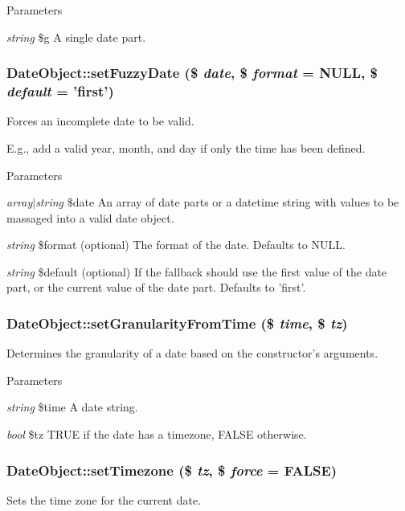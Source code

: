 \begin{DoxyParams}{Parameters}
\item[{\em string}]\$g A single date part. \end{DoxyParams}
\hypertarget{classDateObject_a0a5d9d34e563019feb0079e89ccae619}{
\subsubsection[{setFuzzyDate}]{\setlength{\rightskip}{0pt plus 5cm}DateObject::setFuzzyDate (\$ {\em date}, \/  \$ {\em format} = {\ttfamily NULL}, \/  \$ {\em default} = {\ttfamily 'first'})}}
\label{classDateObject_a0a5d9d34e563019feb0079e89ccae619}
Forces an incomplete date to be valid.

E.g., add a valid year, month, and day if only the time has been defined.


\begin{DoxyParams}{Parameters}
\item[{\em array$|$string}]\$date An array of date parts or a datetime string with values to be massaged into a valid date object. \item[{\em string}]\$format (optional) The format of the date. Defaults to NULL. \item[{\em string}]\$default (optional) If the fallback should use the first value of the date part, or the current value of the date part. Defaults to 'first'. \end{DoxyParams}
\hypertarget{classDateObject_af37aa470a0a1debd8a1b46c0dbaf843f}{
\subsubsection[{setGranularityFromTime}]{\setlength{\rightskip}{0pt plus 5cm}DateObject::setGranularityFromTime (\$ {\em time}, \/  \$ {\em tz})}}
\label{classDateObject_af37aa470a0a1debd8a1b46c0dbaf843f}
Determines the granularity of a date based on the constructor's arguments.


\begin{DoxyParams}{Parameters}
\item[{\em string}]\$time A date string. \item[{\em bool}]\$tz TRUE if the date has a timezone, FALSE otherwise. \end{DoxyParams}
\hypertarget{classDateObject_a2492f42b3e5db5668b9c3cca250767ee}{
\subsubsection[{setTimezone}]{\setlength{\rightskip}{0pt plus 5cm}DateObject::setTimezone (\$ {\em tz}, \/  \$ {\em force} = {\ttfamily FALSE})}}
\label{classDateObject_a2492f42b3e5db5668b9c3cca250767ee}
Sets the time zone for the current date.

